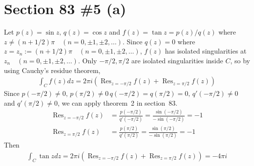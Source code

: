 \documentclass{scrartcl}
\DeclareMathOperator*{\Res}{Res}
\begin{document}
\section{Section 83 \#5 (a)}
Let \(p(z) = \sin z,\, q(z) = \cos z\) and \(f(z) = \tan z = p(z) / q(z)\) where \(z \not = (n + 1 / 2) \pi \quad (n = 0, \pm 1, \pm 2, \dots)\).
Since \(q(z) = 0\) where \(z = z_n := (n + 1/2)\pi \quad (n = 0, \pm 1, \pm 2, \dots)\), \(f(z)\) has isolated singularities at \(z_n \quad (n = 0, \pm 1, \pm 2, \dots)\).
Only \(-\pi / 2, \pi / 2\) are isolated singularities inside \(C\), so by using Cauchy's residue theorem,
\begin{align*}
  \int_C f(z) dz = 2\pi i \left( \Res_{z = -\pi / 2} f(z) + \Res_{z = \pi / 2} f(z) \right)
\end{align*}
Since \(p(-\pi / 2) \not = 0,\, p(\pi / 2) \not = 0\, q(-\pi / 2) = q(\pi / 2) = 0,\, q'(-\pi / 2) \not = 0\) and \(q'(\pi / 2) \not = 0\), we can apply theorem~2 in section~83.
\begin{align*}
  \Res_{z = -\pi / 2} f(z)
  &= \frac{p(-\pi / 2)}{q'(-\pi / 2)}
  = \frac{\sin (-\pi / 2)}{-\sin (-\pi / 2)} = -1 \\
  \Res_{z = \pi / 2} f(z)
  &= \frac{p(\pi / 2)}{q'(\pi / 2)}
  = \frac{\sin (\pi / 2)}{-\sin (\pi / 2)} = -1
\end{align*}
Then
\begin{align*}
  \int_C \tan z dz
  = 2\pi i \left( \Res_{z = -\pi / 2} f(z) + \Res_{z = \pi / 2} f(z) \right)
  = -4\pi i
\end{align*}
\end{document}
